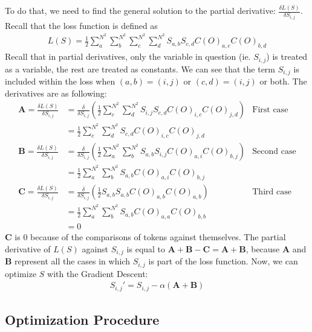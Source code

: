 To do that, we need to find the general solution to the partial derivative: $ \frac{\delta L(S)}{\delta S_{i,j}}$. Recall that the loss function is defined as
\begin{align*}
    L(S)=\frac{1}{2}\sum_{a}^{N^2} \sum_{b}^{N^2} \sum_{c}^{N^2} \sum_{d}^{N^2} S_{a,b} S_{c,d} C(O)_{a,c}C(O)_{b,d}
\end{align*}
Recall that in partial derivatives, only the variable in question (ie. $S_{i,j}$) is treated as a variable, the rest are treated as constants. We can see that the term $S_{i,j}$ is included within the loss when $(a,b)=(i,j)$ or $(c,d)=(i,j)$ or both. The derivatives are as following:
\begin{align*}
        \bm{A}=\frac{\delta L(S)}{\delta S_{i,j}}&=\frac{\delta}{\delta S_{i,j}}\left(\frac{1}{2}\sum_{c}^{N^2} \sum_{d}^{N^2} S_{i,j} S_{c,d} C(O)_{i,c}C(O)_{j,d}\right)&\text{First case}\\
              &=\frac{1}{2}\sum_{c}^{N^2} \sum_{d}^{N^2} S_{c,d} C(O)_{i,c}C(O)_{j,d}&\\
        \bm{B}=\frac{\delta L(S)}{\delta S_{i,j}}&=\frac{\delta}{\delta S_{i,j}}\left(\frac{1}{2}\sum_{a}^{N^2} \sum_{b}^{N^2} S_{a,b} S_{i,j} C(O)_{a,i}C(O)_{b,j}\right)&\text{Second case}\\
              &=\frac{1}{2}\sum_{a}^{N^2} \sum_{b}^{N^2} S_{a,b} C(O)_{a,i}C(O)_{b,j}&\\
        \bm{C}=\frac{\delta L(S)}{\delta S_{i,j}}&=\frac{\delta}{\delta S_{i,j}}\left(\frac{1}{2}S_{a,b} S_{a,b} C(O)_{a,b}C(O)_{a,b}\right)&\text{Third case}\\
              &=\frac{1}{2}\sum_{a}^{N^2} \sum_{b}^{N^2} S_{a,b} C(O)_{a,a}C(O)_{b,b}&\\
              &=0&
\end{align*}
$\bm{C}$ is $0$ because of the comparisons of tokens against themselves. The partial derivative of $L(S)$ against $S_{i,j}$ is equal to $\bm{A}+\bm{B}-\bm{C}=\bm{A}+\bm{B}$, because $\bm{A}$ and $\bm{B}$ represent all the cases in which $S_{i,j}$ is part of the loss function. Now, we can optimize $S$ with the Gradient Descent:
\begin{align*}
        S_{i,j}'=S_{i,j}-\alpha \left(\bm{A}+\bm{B}\right)
\end{align*}

\subsection{Optimization Procedure}%
\label{sub:optimization_procedure}

